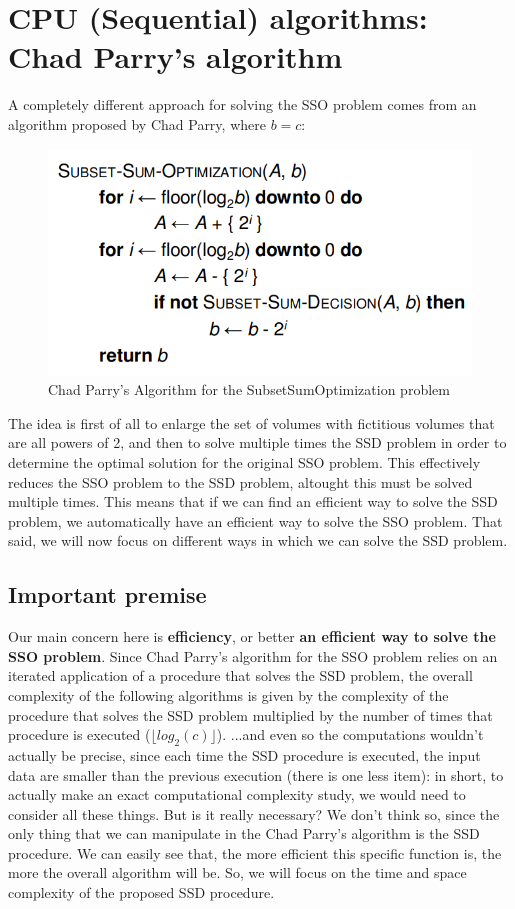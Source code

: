 \documentclass[12pt]{extarticle}
\begin{document}
\section{CPU (Sequential) algorithms: Chad Parry's algorithm}
A completely different approach for solving the SSO problem comes from an algorithm proposed by Chad Parry\cite{website:chad-parry-algo}, where $b = c$:
\begin{figure}[htp]
    \centering
    \includegraphics[width=14cm]{chad parry's algorithm.png}
    \caption{Chad Parry's Algorithm for the SubsetSumOptimization problem}
    \label{fig:chad-parry-algorithm}
\end{figure}\newline
The idea is first of all to enlarge the set of volumes with fictitious volumes that are all powers of 2, and then to solve multiple times the SSD problem in order to determine the optimal solution for the original SSO problem. This effectively reduces the SSO problem to the SSD problem, altought this must be solved multiple times. This means that if we can find an efficient way to solve the SSD problem, we automatically have an efficient way to solve the SSO problem. That said, we will now focus on different ways in which we can solve the SSD problem.
\subsection{Important premise}
Our main concern here is \textbf{efficiency}, or better \textbf{an efficient way to solve the SSO problem}.
Since Chad Parry's algorithm for the SSO problem relies on an iterated application of a procedure that solves the SSD problem, the overall complexity of the following algorithms is given by the complexity of the procedure that solves the SSD problem multiplied by the number of times that procedure is executed ($\lfloor log_2(c) \rfloor$).\newline
...and even so the computations wouldn't actually be precise, since each time the SSD procedure is executed, the input data are smaller than the previous execution (there is one less item): in short, to actually make an exact computational complexity study, we would need to consider all these things. But is it really necessary? We don't think so, since the only thing that we can manipulate in the Chad Parry's algorithm is the SSD procedure. We can easily see that, the more efficient this specific function is, the more the overall algorithm will be. So, we will focus on the time and space complexity of the proposed SSD procedure. 
\end{document}
